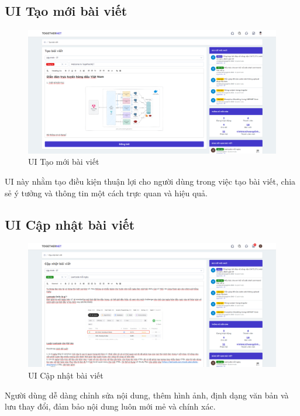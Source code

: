 \documentclass[../index.tex]{subfiles}
\begin{document}
    \subsection{UI Tạo mới bài viết}
    \begin{figure}[H]
        \centering
        \includegraphics[width=1\linewidth]{figures/demo/create-post-page.png}
        \caption{UI Tạo mới bài viết}
    \end{figure}
    UI này nhằm tạo điều kiện thuận lợi cho người dùng trong việc tạo bài
    viết, chia sẻ ý tưởng và thông tin một cách trực quan và hiệu quả.

    \subsection{UI Cập nhật bài viết}
    \begin{figure}[H]
        \centering
        \includegraphics[width=1\linewidth]{figures/demo/update-post-page.png}
        \caption{UI Cập nhật bài viết}
    \end{figure}
    Người dùng dễ dàng chỉnh sửa nội dung, thêm hình ảnh, định dạng văn bản và lưu
    thay đổi, đảm bảo nội dung luôn mới mẻ và chính xác.
\end{document}
